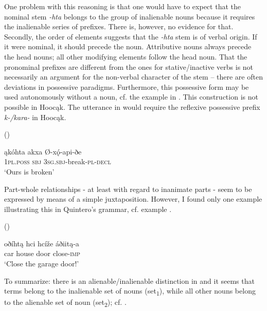 \documentclass[output=paper]{LSP/langsci}
\begin{document}
One problem with this reasoning is that one would have to expect that the nominal stem \textit{-hta} belongs to the group of inalienable nouns because it requires the inalienable series of prefixes. There is, however, no evidence for that. Secondly, the order of elements suggests that the \textit{-hta} stem is of verbal origin. If it were nominal, it should precede the  noun. Attributive nouns always precede the head nouns; all other modifying elements follow the head noun. That the pronominal prefixes are different from the ones for stative/inactive verbs is not necessarily an argument for the non-verbal character of the stem -- there are often deviations in possessive paradigms. Furthermore, this possessive form may be used autonomously without a  noun, cf. the example in . This construction is not possible in Hoocąk. The utterance in  would require the reflexive possessive prefix \textit{k-/kara-} in Hoocąk.

\ea	{} (\citealt[413]{Quintero2004}) \label{osagebroken}

\gll ąkóhta     akxa     Ø-xǫ́-api-ðe \\
\textsc{1pl.poss} \textsc{sbj} \textsc{3sg.sbj}-break-\textsc{pl-decl} \\
\glt `Ours is broken'
\z 

Part-whole relationships - at least with regard to inanimate parts - seem to be expressed by means of a simple juxtaposition. However, I found only one example illustrating this in Quintero's grammar, cf. example .

\ea	{} (\citealt[423]{Quintero2004}) \label{osagegarage}

\gll oðíhtą hci      hcíže áðiitą-a \\
car       house door close-\textsc{imp} \\
\glt `Close the garage door!'
\z

To summarize: there is an alienable/inalienable distinction in  and it seems that  terms belong to the inalienable set of nouns (set\textsubscript{1}), while all other nouns belong to the alienable set of noun (set\textsubscript{2}); cf. .
\end{document}
